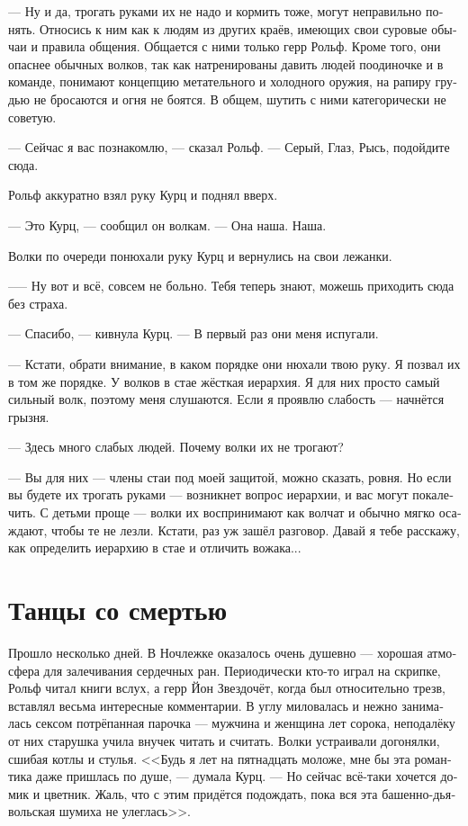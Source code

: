 \documentclass[a4paper,12pt,fleqn]{book}\usepackage{polyglossia}\setdefaultlanguage[babelshorthands=true]{russian}\setotherlanguage{english}\defaultfontfeatures{Ligatures=TeX,Mapping=tex-text}\usepackage{xcolor}\newcommand{\ml}[3]{#2}
\newcommand{\asterism}{\vspace{1em}{\centering\Large\bfseries$\ast~\ast~\ast$\par}\vspace{1em}}
\begin{document}
--- Ну и да, трогать руками их не надо и кормить тоже, могут неправильно понять.
Относись к ним как к людям из других краёв, имеющих свои суровые обычаи и правила общения.
Общается с ними только герр Рольф.
Кроме того, они опаснее обычных волков, так как натренированы давить людей поодиночке и в команде, понимают концепцию метательного и холодного оружия, на рапиру грудью не бросаются и огня не боятся.
В общем, шутить с ними категорически не советую. 

\asterism

--- Сейчас я вас познакомлю, --- сказал Рольф.
--- Серый, Глаз, Рысь, подойдите сюда.

Рольф аккуратно взял руку Курц и поднял вверх.

--- Это Курц, --- сообщил он волкам.
--- Она наша.
Наша.

Волки по очереди понюхали руку Курц и вернулись на свои лежанки.

--— Ну вот и всё, совсем не больно.
Тебя теперь знают, можешь приходить сюда без страха.

--- Спасибо, --- кивнула Курц.
--- В первый раз они меня испугали.

--- Кстати, обрати внимание, в каком порядке они нюхали твою руку.
Я позвал их в том же порядке.
У волков в стае жёсткая иерархия.
Я для них просто самый сильный волк, поэтому меня слушаются.
Если я проявлю слабость --- начнётся грызня.

--- Здесь много слабых людей.
Почему волки их не трогают?

--- Вы для них --- члены стаи под моей защитой, можно сказать, ровня.
Но если вы будете их трогать руками --- возникнет вопрос иерархии, и вас могут покалечить.
С детьми проще --- волки их воспринимают как волчат и обычно мягко осаждают, чтобы те не лезли.
Кстати, раз уж зашёл разговор.
Давай я тебе расскажу, как определить иерархию в стае и отличить вожака...

\section{Танцы со смертью}

Прошло несколько дней.
В Ночлежке оказалось очень душевно --- хорошая атмосфера для залечивания сердечных ран.
Периодически кто-то играл на скрипке, Рольф читал книги вслух, а герр Йон Звездочёт, когда был относительно трезв, вставлял весьма интересные комментарии.
В углу миловалась и нежно занималась сексом потрёпанная парочка --- мужчина и женщина лет сорока, неподалёку от них старушка учила внучек читать и считать.
Волки устраивали догонялки, сшибая котлы и стулья.
<<Будь я лет на пятнадцать моложе, мне бы эта романтика даже пришлась по душе, --- думала Курц.
--- Но сейчас всё-таки хочется домик и цветник.
Жаль, что с этим придётся подождать, пока вся эта башенно-дьявольская шумиха не улеглась>>.
\end{document}
